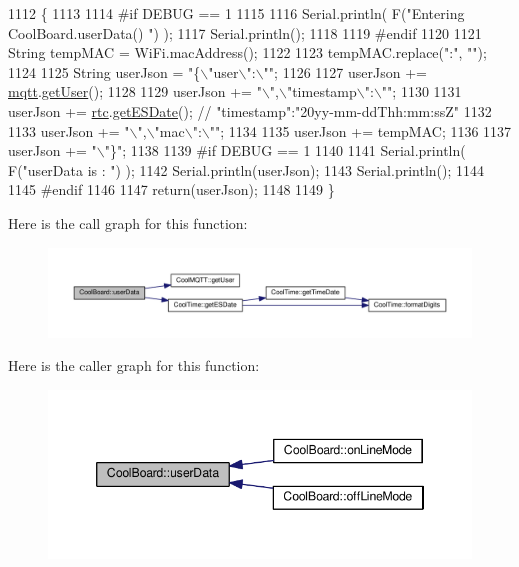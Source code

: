 \begin{DoxyCode}
1112 \{
1113 
1114 \textcolor{preprocessor}{#if DEBUG == 1}
1115 
1116     Serial.println( F(\textcolor{stringliteral}{"Entering CoolBoard.userData() "}) );
1117     Serial.println();
1118 
1119 \textcolor{preprocessor}{#endif}
1120 
1121     String tempMAC = WiFi.macAddress();
1122 
1123     tempMAC.replace(\textcolor{stringliteral}{":"}, \textcolor{stringliteral}{""});
1124 
1125     String userJson = \textcolor{stringliteral}{"\{\(\backslash\)"user\(\backslash\)":\(\backslash\)""};
1126 
1127     userJson += \hyperlink{class_cool_board_a2399f44d7c23c1149a335cb3b46d90f1}{mqtt}.\hyperlink{class_cool_m_q_t_t_a373cc92fca7760d886f02d8a6e5b3f63}{getUser}();
1128 
1129     userJson += \textcolor{stringliteral}{"\(\backslash\)",\(\backslash\)"timestamp\(\backslash\)":\(\backslash\)""};
1130 
1131     userJson += \hyperlink{class_cool_board_a50d2a6716879d64a85f3c6b44ad63275}{rtc}.\hyperlink{class_cool_time_ac4f32ee513c1328d984306645e8785a4}{getESDate}(); \textcolor{comment}{// "timestamp":"20yy-mm-ddThh:mm:ssZ"}
1132 
1133     userJson += \textcolor{stringliteral}{"\(\backslash\)",\(\backslash\)"mac\(\backslash\)":\(\backslash\)""};
1134 
1135     userJson += tempMAC;
1136 
1137     userJson += \textcolor{stringliteral}{"\(\backslash\)"\}"};
1138 
1139 \textcolor{preprocessor}{#if DEBUG == 1}
1140 
1141     Serial.println( F(\textcolor{stringliteral}{"userData is : "}) );
1142     Serial.println(userJson);
1143     Serial.println();
1144 
1145 \textcolor{preprocessor}{#endif  }
1146     
1147     \textcolor{keywordflow}{return}(userJson);
1148     
1149 \}
\end{DoxyCode}
Here is the call graph for this function\+:\nopagebreak
\begin{figure}[H]
\begin{center}
\leavevmode
\includegraphics[width=350pt]{d7/df9/class_cool_board_ae7358fb6e623cfc81b775f5f1734909b_cgraph}
\end{center}
\end{figure}
Here is the caller graph for this function\+:\nopagebreak
\begin{figure}[H]
\begin{center}
\leavevmode
\includegraphics[width=346pt]{d7/df9/class_cool_board_ae7358fb6e623cfc81b775f5f1734909b_icgraph}
\end{center}
\end{figure}


